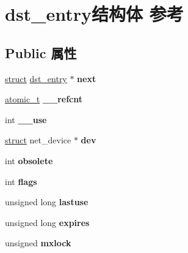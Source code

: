 \hypertarget{structdst__entry}{}\section{dst\+\_\+entry结构体 参考}
\label{structdst__entry}
\subsection*{Public 属性}
\begin{DoxyCompactItemize}
\item 
\mbox{\label{structdst__entry_a6b9bbfe0f4029b4ca5ee6d1c5849bea8}} 
\hyperlink{interfacestruct}{struct} \hyperlink{structdst__entry}{dst\+\_\+entry} $\ast$ {\bfseries next}
\item 
\mbox{\label{structdst__entry_ad4527833c029acd8a95ca64feaf10f3a}} 
\hyperlink{structatomic__t}{atomic\+\_\+t} {\bfseries \+\_\+\+\_\+refcnt}
\item 
\mbox{\label{structdst__entry_a2907f090cff3751a7b413104492f7e9b}} 
int {\bfseries \+\_\+\+\_\+use}
\item 
\mbox{\label{structdst__entry_a4565acbb7eb15750c29e4f08c2af7649}} 
\hyperlink{interfacestruct}{struct} net\+\_\+device $\ast$ {\bfseries dev}
\item 
\mbox{\label{structdst__entry_aff43c603f70ab746b5f52069d87de7b6}} 
int {\bfseries obsolete}
\item 
\mbox{\label{structdst__entry_a7ee51ae047d2d51e4bfab89e0739b9f4}} 
int {\bfseries flags}
\item 
\mbox{\label{structdst__entry_a1d66ed0c1789778de5768b9caac5b405}} 
unsigned long {\bfseries lastuse}
\item 
\mbox{\label{structdst__entry_af57c9c62e6a40fc029dcdd222ccb831c}} 
unsigned long {\bfseries expires}
\item 
\mbox{\label{structdst__entry_a0bfc5cdec3101e6fd9ca75b95adb22be}} 
unsigned {\bfseries mxlock}
\item 

\end{DoxyCompactItemize}
